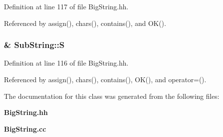 Definition at line 117 of file Big\-String.hh.

Referenced by assign(), chars(), contains(), and OK().
\subsubsection{\& Sub\-String::S\hspace{0.3cm}{\tt  [protected]}}\label{classSubString_n0}




Definition at line 116 of file Big\-String.hh.

Referenced by assign(), chars(), contains(), OK(), and operator=().

The documentation for this class was generated from the following files:\begin{CompactItemize}
\item 
{\bf Big\-String.hh}\item 
{\bf Big\-String.cc}\end{CompactItemize}
